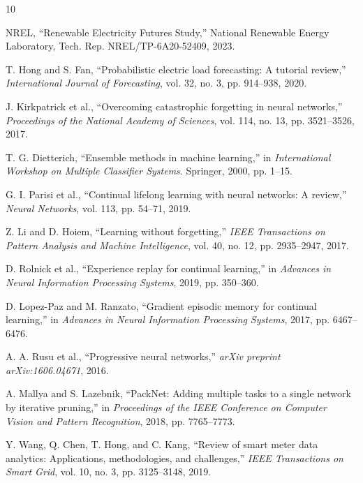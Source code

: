\documentclass[journal]{IEEEtran}
\begin{document}

\begin{thebibliography}{10}

NREL, ``Renewable Electricity Futures Study,'' National Renewable Energy Laboratory, Tech. Rep. NREL/TP-6A20-52409, 2023.

T. Hong and S. Fan, ``Probabilistic electric load forecasting: A tutorial review,'' \textit{International Journal of Forecasting}, vol. 32, no. 3, pp. 914--938, 2020.

J. Kirkpatrick et al., ``Overcoming catastrophic forgetting in neural networks,'' \textit{Proceedings of the National Academy of Sciences}, vol. 114, no. 13, pp. 3521--3526, 2017.

T. G. Dietterich, ``Ensemble methods in machine learning,'' in \textit{International Workshop on Multiple Classifier Systems}. Springer, 2000, pp. 1--15.

G. I. Parisi et al., ``Continual lifelong learning with neural networks: A review,'' \textit{Neural Networks}, vol. 113, pp. 54--71, 2019.

Z. Li and D. Hoiem, ``Learning without forgetting,'' \textit{IEEE Transactions on Pattern Analysis and Machine Intelligence}, vol. 40, no. 12, pp. 2935--2947, 2017.

D. Rolnick et al., ``Experience replay for continual learning,'' in \textit{Advances in Neural Information Processing Systems}, 2019, pp. 350--360.

D. Lopez-Paz and M. Ranzato, ``Gradient episodic memory for continual learning,'' in \textit{Advances in Neural Information Processing Systems}, 2017, pp. 6467--6476.

A. A. Rusu et al., ``Progressive neural networks,'' \textit{arXiv preprint arXiv:1606.04671}, 2016.

A. Mallya and S. Lazebnik, ``PackNet: Adding multiple tasks to a single network by iterative pruning,'' in \textit{Proceedings of the IEEE Conference on Computer Vision and Pattern Recognition}, 2018, pp. 7765--7773.

Y. Wang, Q. Chen, T. Hong, and C. Kang, ``Review of smart meter data analytics: Applications, methodologies, and challenges,'' \textit{IEEE Transactions on Smart Grid}, vol. 10, no. 3, pp. 3125--3148, 2019.


\end{thebibliography}
\end{document}
